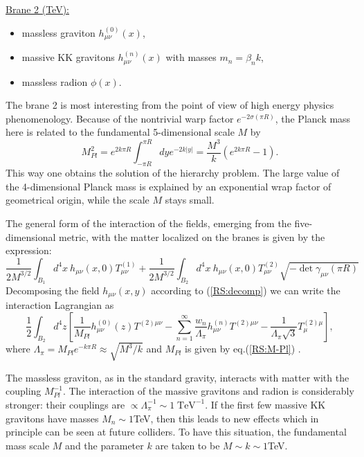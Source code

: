 \documentclass{cernyrep}
\begin{document}
\hspace*{8cm}\begin{minipage}[h]{7cm}
 \underline{Brane 2 (TeV):}
\begin{itemize}
  \item massless graviton $h_{\mu \nu}^{(0)}(x)$,
  \item massive KK gravitons $h_{\mu \nu}^{(n)}(x)$ with masses
  $m_{n}=\beta_{n} k $,
  \item massless radion $\phi (x)$.
\end{itemize}
\end{minipage}\vspace{1cm}

The brane 2  is most interesting from the point of view of high
energy physics phenomenology.  Because of the nontrivial warp
factor $e^{-2\sigma (\pi R)}$, the Planck mass here is related to
the fundamental 5-dimensional scale $M$ by
\begin{equation}\label{RS:M-Pl}
  M_{Pl}^{2} =
e^{2k\pi R} \int_{-\pi R}^{\pi R} dy e^{-2k|y|} = \frac{M^{3}}{k}
\left( e^{2k \pi R} - 1 \right).
\end{equation}
This way one obtains the solution of the hierarchy problem. The
large value of the 4-dimensional Planck mass is explained by an
exponential wrap factor of geometrical origin, while the scale $M$
stays small.

The general form of the interaction of the fields, emerging from
the five-dimensional metric,  with the matter localized on the
branes is given by the expression:
\[
\frac{1}{2 M^{3/2}} \int_{B_{1}} d^{4}x\ h_{\mu \nu}(x,0)
T^{(1)}_{\mu \nu} + \frac{1}{2 M^{3/2}} \int_{B_{2}} d^{4}x\
h_{\mu \nu}(x,0) T^{(2)}_{\mu \nu} \sqrt{-\det \gamma_{\mu \nu}
(\pi R)}
\]
Decomposing the field $h_{\mu\nu}(x,y)$ according to
(\ref{RS:decomp}) we can write  the interaction Lagrangian  as
\begin{equation}
  \frac{1}{2} \int_{B_{2}} d^{4}z \left[ \frac{1}{M_{Pl}}
h^{(0)}_{\mu \nu}(z) T^{(2)\mu \nu} - \sum_{n=1}^{\infty}
\frac{w_{n}}{\Lambda_{\pi}} h^{(n)}_{\mu \nu} T^{(2)\mu \nu} -
\frac{1}{\Lambda_{\pi}\sqrt{3}}T^{(2)\mu}_{\mu} \right],
\label{RS:int2}
\end{equation}
where $\Lambda_{\pi} = M_{Pl} e^{-k \pi R} \approx \sqrt{M^{3}/k}$
and $M_{Pl}$ is given by eq.(\ref{RS:M-Pl}) .

The massless graviton, as in the standard gravity, interacts with
matter with the coupling $M_{Pl}^{-1}$. The interaction of the
massive gravitons and radion is considerably stronger: their
couplings are $\propto \Lambda_{\pi}^{-1} \sim 1 \;
\mbox{TeV}^{-1}$. If the first few massive KK gravitons have masses
$M_{n} \sim 1$TeV, then this leads to new effects which in
principle can be seen at future colliders. To have this situation,
the fundamental mass scale $M$ and the parameter $k$ are taken to
be $M \sim k \sim 1$TeV.
\end{document}
